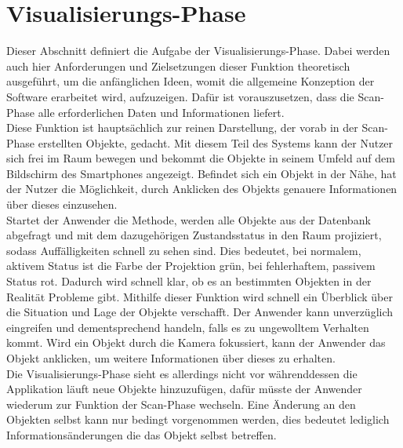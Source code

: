 \section{Visualisierungs-Phase}
\label{chap:Visualisierungs-Phase}
Dieser Abschnitt definiert die Aufgabe der Visualisierungs-Phase. Dabei werden auch hier Anforderungen und Zielsetzungen dieser Funktion 
theoretisch ausgeführt, um die anfänglichen Ideen, womit die allgemeine Konzeption der Software erarbeitet wird, aufzuzeigen. Dafür ist 
vorauszusetzen, dass die Scan-Phase alle erforderlichen Daten und Informationen liefert. 
\\ 
\linebreak
Diese Funktion ist hauptsächlich zur reinen Darstellung, der vorab in der Scan-Phase erstellten Objekte, gedacht. Mit diesem Teil des Systems 
kann der Nutzer sich frei im Raum bewegen und bekommt die Objekte in seinem Umfeld auf dem Bildschirm des Smartphones angezeigt. 
Befindet sich ein Objekt in der Nähe, hat der Nutzer die Möglichkeit, durch Anklicken des Objekts genauere Informationen über dieses einzusehen. 
\\ 
\linebreak 
Startet der Anwender die Methode, werden alle Objekte aus der Datenbank abgefragt und mit dem dazugehörigen Zustandsstatus in den Raum 
projiziert, sodass Auffälligkeiten schnell zu sehen sind. Dies bedeutet, bei normalem, aktivem Status ist die Farbe der Projektion grün, 
bei fehlerhaftem, passivem Status rot. Dadurch wird schnell klar, ob es an bestimmten Objekten in der Realität Probleme gibt. Mithilfe dieser 
Funktion wird schnell ein Überblick über die Situation und Lage der Objekte verschafft. Der Anwender kann unverzüglich eingreifen und 
dementsprechend handeln, falls es zu ungewolltem Verhalten kommt. Wird ein Objekt durch die Kamera fokussiert, kann der Anwender das Objekt 
anklicken, um weitere Informationen über dieses zu erhalten. 
\\ 
Die Visualisierungs-Phase sieht es allerdings nicht vor währenddessen die Applikation läuft neue Objekte hinzuzufügen, dafür müsste der Anwender wiederum zur 
Funktion der Scan-Phase wechseln. Eine Änderung an den Objekten selbst kann nur bedingt vorgenommen werden, dies bedeutet lediglich 
Informationsänderungen die das Objekt selbst betreffen.  

